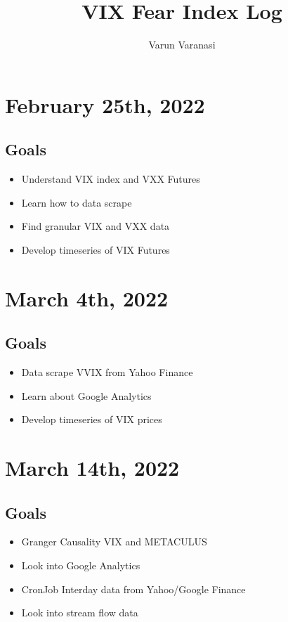 \documentclass{article}
\title{VIX Fear Index Log}
\author{Varun Varanasi}
\begin{document}
\maketitle

\tableofcontents
\newpage

\section{February 25th, 2022}

\subsection*{Goals}
\begin{itemize}
    \item Understand VIX index and VXX Futures
    \item Learn how to data scrape
    \item Find granular VIX and VXX data
    \item Develop timeseries of VIX Futures
\end{itemize}


\section{March 4th, 2022}

\subsection*{Goals}
\begin{itemize}
    \item Data scrape VVIX from Yahoo Finance
    \item Learn about Google Analytics
    \item Develop timeseries of VIX prices
\end{itemize}

\section{March 14th, 2022}

\subsection*{Goals}
\begin{itemize}
    \item Granger Causality VIX and METACULUS
    \item Look into Google Analytics
    \item CronJob Interday data from Yahoo/Google Finance
    \item Look into stream flow data
\end{itemize}
\end{document}

